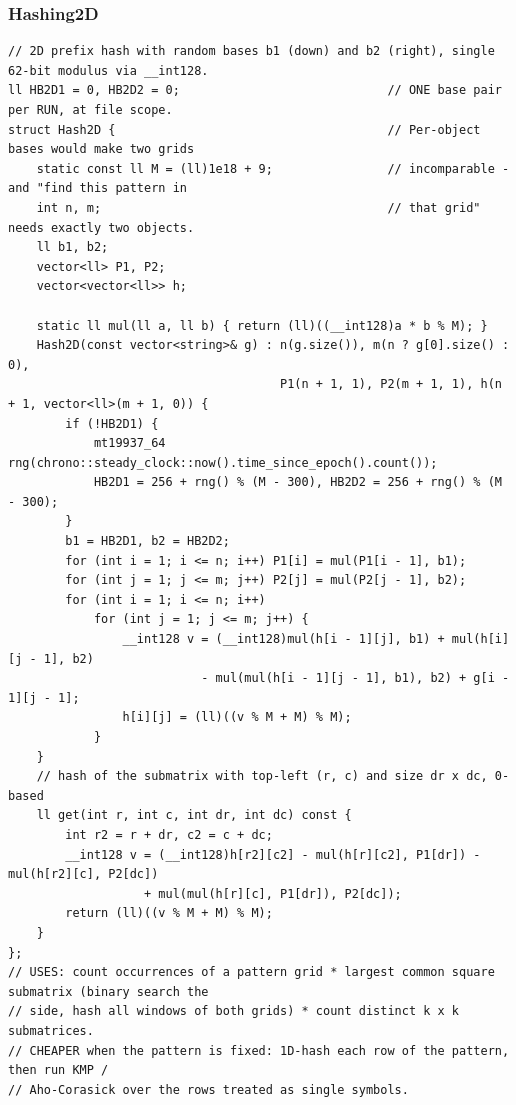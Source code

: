 \documentclass[9pt,a4paper,twocolumn]{extarticle}
\begin{document}
\subsubsection{Hashing2D}
\nopagebreak
\begin{lstlisting}
// 2D prefix hash with random bases b1 (down) and b2 (right), single 62-bit modulus via __int128.
ll HB2D1 = 0, HB2D2 = 0;                             // ONE base pair per RUN, at file scope.
struct Hash2D {                                      // Per-object bases would make two grids
    static const ll M = (ll)1e18 + 9;                // incomparable - and "find this pattern in
    int n, m;                                        // that grid" needs exactly two objects.
    ll b1, b2;
    vector<ll> P1, P2;
    vector<vector<ll>> h;

    static ll mul(ll a, ll b) { return (ll)((__int128)a * b % M); }
    Hash2D(const vector<string>& g) : n(g.size()), m(n ? g[0].size() : 0),
                                      P1(n + 1, 1), P2(m + 1, 1), h(n + 1, vector<ll>(m + 1, 0)) {
        if (!HB2D1) {
            mt19937_64 rng(chrono::steady_clock::now().time_since_epoch().count());
            HB2D1 = 256 + rng() % (M - 300), HB2D2 = 256 + rng() % (M - 300);
        }
        b1 = HB2D1, b2 = HB2D2;
        for (int i = 1; i <= n; i++) P1[i] = mul(P1[i - 1], b1);
        for (int j = 1; j <= m; j++) P2[j] = mul(P2[j - 1], b2);
        for (int i = 1; i <= n; i++)
            for (int j = 1; j <= m; j++) {
                __int128 v = (__int128)mul(h[i - 1][j], b1) + mul(h[i][j - 1], b2)
                           - mul(mul(h[i - 1][j - 1], b1), b2) + g[i - 1][j - 1];
                h[i][j] = (ll)((v % M + M) % M);
            }
    }
    // hash of the submatrix with top-left (r, c) and size dr x dc, 0-based
    ll get(int r, int c, int dr, int dc) const {
        int r2 = r + dr, c2 = c + dc;
        __int128 v = (__int128)h[r2][c2] - mul(h[r][c2], P1[dr]) - mul(h[r2][c], P2[dc])
                   + mul(mul(h[r][c], P1[dr]), P2[dc]);
        return (ll)((v % M + M) % M);
    }
};
// USES: count occurrences of a pattern grid * largest common square submatrix (binary search the
// side, hash all windows of both grids) * count distinct k x k submatrices.
// CHEAPER when the pattern is fixed: 1D-hash each row of the pattern, then run KMP /
// Aho-Corasick over the rows treated as single symbols.
\end{lstlisting}
\end{document}
